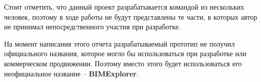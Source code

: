 Стоит отметить, что данный проект разрабатывается командой из нескольких человек,
поэтому в ходе работы не будут представлены те части,
в которых автор не принимал непосредственного участия при разработке.

На момент написания этого отчета разрабатываемый прототип не получил
официального названия, которое могло бы использоваться при разработке
или коммерческом продвижении. Поэтому вместо этого будет использоваться
его неофициальное название -- {\bf BIMExplorer}.